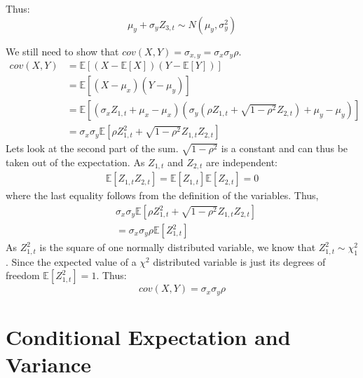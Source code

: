 \message{ !name(three_four.tex)}\documentclass[11pt]{article}
\begin{document}
Thus:
\begin{equation}
  \label{eq:6}
  \mu_y + \sigma_y Z_{3,t} \sim N(\mu_y, \sigma^2_y)
\end{equation}

We still need to show that $cov(X,Y) = \sigma_{x,y} = \sigma_x \sigma_y \rho$.
\begin{equation}
  \label{eq:7}
  \begin{split}
    cov(X,Y) &= \mathbb{E}[(X - \mathbb{E}[X])(Y - \mathbb{E}[Y])]\\
    &= \mathbb{E}[(X - \mu_x)(Y-\mu_y)]\\
    &= \mathbb{E}[(\sigma_x Z_{1,t} + \mu_x - \mu_x)(\sigma_y (\rho Z_{1,t} + \sqrt{1-\rho^2} Z_{2,t}) + \mu_y - \mu_y)]\\
    &= \sigma_x \sigma_y \mathbb{E}[\rho Z^2_{1,t} + \sqrt{1-\rho^2}Z_{1,t}Z_{2,t}]
  \end{split}
\end{equation}
Lets look at the second part of the sum. $\sqrt{1-\rho^2}$ is a constant and can thus be taken out of the expectation. As $Z_{1,t}$ and $Z_{2,t}$ are independent:
\begin{equation}
  \label{eq:8}
  \begin{split}
    \mathbb{E}[Z_{1,t}Z_{2,t}] = \mathbb{E}[Z_{1,t}] \mathbb{E}[Z_{2,t}] = 0 
  \end{split}
\end{equation}
where the last equality follows from the definition of the variables.
Thus,
\begin{equation}
  \label{eq:9}
  \begin{split}
  &\sigma_x \sigma_y \mathbb{E}[\rho Z^2_{1,t} + \sqrt{1-\rho^2}Z_{1,t}Z_{2,t}]\\
  &= \sigma_x \sigma_y \rho \mathbb{E}[Z^2_{1,t}]
\end{split}
\end{equation}
As $Z^2_{1,t}$ is the square of one normally distributed variable, we know that $Z^2_{1,t} \sim \chi^2_1$. Since the expected value of a $\chi^2$ distributed variable is just its degrees of freedom $\mathbb{E}[Z^2_{1,t}] = 1$. Thus:
\begin{equation}
  \label{eq:10}
  cov(X,Y) = \sigma_x \sigma_y \rho
\end{equation}

\section{Conditional Expectation and Variance}
\label{sec:cond-expect-vari}
\end{document}
